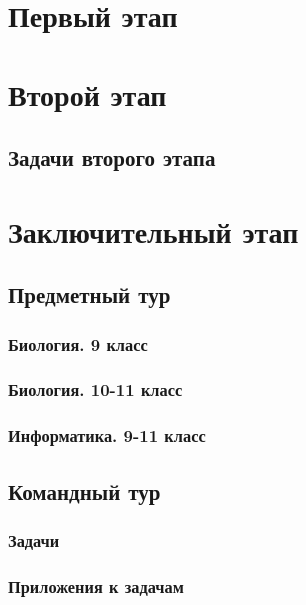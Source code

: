 \documentclass[a4paper,12pt,oneside]{book}
\begin{document}

\setcounter{tocdepth}{1}

\setcounter{page}{3}

\tableofcontents



\part{Первый этап}
\clearpage
 



\part{Второй этап}
\clearpage
\chapter{Задачи второго этапа}



\part{Заключительный этап}

\clearpage
\chapter{Предметный тур}

\section{Биология. 9 класс}


\section{Биология. 10-11 класс}


\section{Информатика. 9-11 класс}


\chapter{Командный тур}

\section{Задачи} 



\section{Приложения к задачам}



\end{document}
